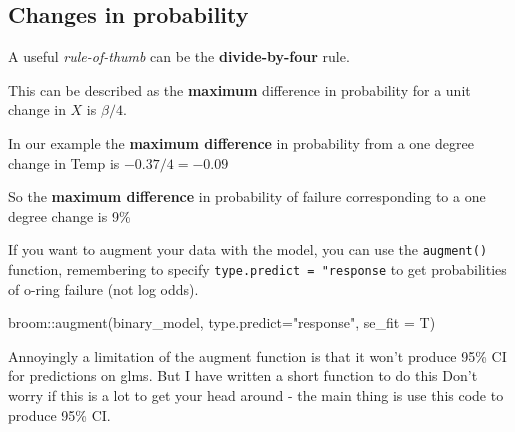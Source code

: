 \documentclass[
]{book}
\newenvironment{Shaded}{\begin{snugshade}}{\end{snugshade}}
\newcommand{\AttributeTok}[1]{\textcolor[rgb]{0.77,0.63,0.00}{#1}}
\newcommand{\ConstantTok}[1]{\textcolor[rgb]{0.00,0.00,0.00}{#1}}
\newcommand{\ControlFlowTok}[1]{\textcolor[rgb]{0.13,0.29,0.53}{\textbf{#1}}}
\newcommand{\FloatTok}[1]{\textcolor[rgb]{0.00,0.00,0.81}{#1}}
\newcommand{\FunctionTok}[1]{\textcolor[rgb]{0.00,0.00,0.00}{#1}}
\newcommand{\NormalTok}[1]{#1}
\newcommand{\OtherTok}[1]{\textcolor[rgb]{0.56,0.35,0.01}{#1}}
\newcommand{\SpecialCharTok}[1]{\textcolor[rgb]{0.00,0.00,0.00}{#1}}
\newcommand{\StringTok}[1]{\textcolor[rgb]{0.31,0.60,0.02}{#1}}
\begin{document}
\hypertarget{changes-in-probability}{%
\subsection{Changes in probability}\label{changes-in-probability}}

A useful \emph{rule-of-thumb} can be the \textbf{divide-by-four} rule.

This can be described as the \textbf{maximum} difference in probability for a unit change in \(X\) is \(\beta/4\).

In our example the \textbf{maximum difference} in probability from a one degree change in Temp is \(-0.37/4 = -0.09\)

So the \textbf{maximum difference} in probability of failure corresponding to a one degree change is 9\%

If you want to augment your data with the model, you can use the \texttt{augment()} function, remembering to specify \texttt{type.predict\ =\ "response} to get probabilities of o-ring failure (not log odds).

\begin{Shaded}
\begin{Highlighting}[]
\NormalTok{broom}\SpecialCharTok{::}\FunctionTok{augment}\NormalTok{(binary\_model, }\AttributeTok{type.predict=}\StringTok{"response"}\NormalTok{, }\AttributeTok{se\_fit =}\NormalTok{ T) }
\end{Highlighting}
\end{Shaded}

Annoyingly a limitation of the augment function is that it won't produce 95\% CI for predictions on glms. But I have written a short function to do this
Don't worry if this is a lot to get your head around - the main thing is use this code to produce 95\% CI.

\begin{Shaded}
\end{Shaded}
\end{document}
